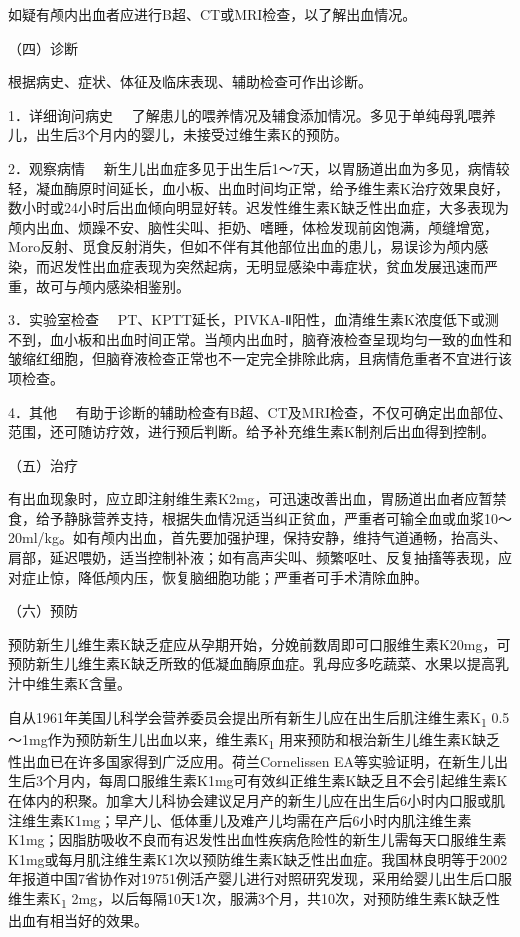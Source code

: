如疑有颅内出血者应进行B超、CT或MRI检查，以了解出血情况。

（四）诊断

根据病史、症状、体征及临床表现、辅助检查可作出诊断。

{1．详细询问病史}
　了解患儿的喂养情况及辅食添加情况。多见于单纯母乳喂养儿，出生后3个月内的婴儿，未接受过维生素K的预防。

{2．观察病情}
　新生儿出血症多见于出生后1～7天，以胃肠道出血为多见，病情较轻，凝血酶原时间延长，血小板、出血时间均正常，给予维生素K治疗效果良好，数小时或24小时后出血倾向明显好转。迟发性维生素K缺乏性出血症，大多表现为颅内出血、烦躁不安、脑性尖叫、拒奶、嗜睡，体检发现前囟饱满，颅缝增宽，Moro反射、觅食反射消失，但如不伴有其他部位出血的患儿，易误诊为颅内感染，而迟发性出血症表现为突然起病，无明显感染中毒症状，贫血发展迅速而严重，故可与颅内感染相鉴别。

{3．实验室检查}
　PT、KPTT延长，PIVKA-Ⅱ阳性，血清维生素K浓度低下或测不到，血小板和出血时间正常。当颅内出血时，脑脊液检查呈现均匀一致的血性和皱缩红细胞，但脑脊液检查正常也不一定完全排除此病，且病情危重者不宜进行该项检查。

{4．其他}
　有助于诊断的辅助检查有B超、CT及MRI检查，不仅可确定出血部位、范围，还可随访疗效，进行预后判断。给予补充维生素K制剂后出血得到控制。

（五）治疗

有出血现象时，应立即注射维生素K2mg，可迅速改善出血，胃肠道出血者应暂禁食，给予静脉营养支持，根据失血情况适当纠正贫血，严重者可输全血或血浆10～20ml/kg。如有颅内出血，首先要加强护理，保持安静，维持气道通畅，抬高头、肩部，延迟喂奶，适当控制补液；如有高声尖叫、频繁呕吐、反复抽搐等表现，应对症止惊，降低颅内压，恢复脑细胞功能；严重者可手术清除血肿。

（六）预防

预防新生儿维生素K缺乏症应从孕期开始，分娩前数周即可口服维生素K20mg，可预防新生儿维生素K缺乏所致的低凝血酶原血症。乳母应多吃蔬菜、水果以提高乳汁中维生素K含量。

自从1961年美国儿科学会营养委员会提出所有新生儿应在出生后肌注维生素K\textsubscript{1}
0.5～1mg作为预防新生儿出血以来，维生素K\textsubscript{1}
用来预防和根治新生儿维生素K缺乏性出血已在许多国家得到广泛应用。荷兰Cornelissen
EA等实验证明，在新生儿出生后3个月内，每周口服维生素K1mg可有效纠正维生素K缺乏且不会引起维生素K在体内的积聚。加拿大儿科协会建议足月产的新生儿应在出生后6小时内口服或肌注维生素K1mg；早产儿、低体重儿及难产儿均需在产后6小时内肌注维生素K1mg；因脂肪吸收不良而有迟发性出血性疾病危险性的新生儿需每天口服维生素K1mg或每月肌注维生素K1次以预防维生素K缺乏性出血症。我国林良明等于2002年报道中国7省协作对19751例活产婴儿进行对照研究发现，采用给婴儿出生后口服维生素K\textsubscript{1}
2mg，以后每隔10天1次，服满3个月，共10次，对预防维生素K缺乏性出血有相当好的效果。


